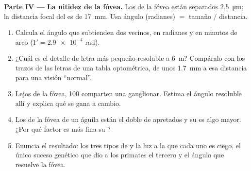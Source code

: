 \begin{problem}
\medskip
\noindent\textbf{Parte IV --- La nitidez de la fóvea.}
Los  de la fóvea están separados \qty{2.5}{\micro m}; la distancia
focal del  es de \qty{17}{mm}. Usa ángulo (radianes) $=$ tamaño $/$
distancia.
\begin{enumerate}[resume]
  \item Calcula el ángulo que subtienden dos  vecinos, en radianes
        y en minutos de arco ($1' = \num{2.9e-4}$ rad).
  \item ¿Cuál es el detalle de letra más pequeño resoluble a
        \qty{6}{m}? Compáralo con los trazos de las letras de una tabla
        optométrica, de unos \qty{1.7}{mm} a esa distancia para una
        visión ``normal''.
  \item Lejos de la fóvea, 100  comparten una 
        ganglionar. Estima el ángulo resoluble allí y explica qué se
        gana a cambio.
  \item Los  de la fóvea de un águila están el doble de apretados
        y su  es algo mayor. ¿Por qué factor es más fina su
        ?
  \item Enuncia el resultado: los tres tipos de  y la luz a la que
        cada uno es ciego, el único suceso genético que dio a los
        primates el tercero y el ángulo que resuelve la fóvea.
\end{enumerate}
\end{problem}
